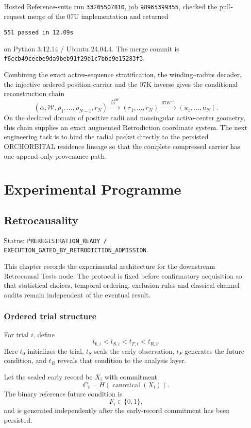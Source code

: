 \documentclass[11pt]{book}
\begin{document}
Hosted Reference-suite run \texttt{33205507810}, job \texttt{98965399355}, checked the pull-request merge of the 07U implementation and returned
\begin{verbatim}
551 passed in 12.09s
\end{verbatim}
on Python 3.12.14 / Ubuntu 24.04.4. The merge commit is \texttt{f6ccb49cecbe9da9beb91f29b1c7bbc9e15283f3}.

Combining the exact active-sequence stratification, the winding--radius decoder, the injective ordered position carrier and the 07K inverse gives the conditional reconstruction chain
\[
\boxed{
(\alpha,\mathcal W,\rho_1,\ldots,\rho_{N-1},r_N)
\xrightarrow{\ L_s^{\rho W}\ }
(r_1,\ldots,r_N)
\xrightarrow{\ 07K^{-1}\ }
(u_1,\ldots,u_N).
}
\]
On the declared domain of positive radii and nonsingular active-center geometry, this chain supplies an exact augmented Retrodiction coordinate system. The next engineering task is to bind the radial packet directly to the persisted ORCHORBITAL residence lineage so that the complete compressed carrier has one append-only provenance path.

\part{Experimental Programme}
\chapter{Retrocausality}

Status: \texttt{PREREGISTRATION\_READY / EXECUTION\_GATED\_BY\_RETRODICTION\_ADMISSION}.

This chapter records the experimental architecture for the downstream Retrocausal Tests node. The protocol is fixed before confirmatory acquisition so that statistical choices, temporal ordering, exclusion rules and classical-channel audits remain independent of the eventual result.

\section{Ordered trial structure}

For trial $i$, define
\[
\boxed{t_{0,i}<t_{S,i}<t_{F,i}<t_{R,i}.}
\]
Here $t_0$ initializes the trial, $t_S$ seals the early observation, $t_F$ generates the future condition, and $t_R$ reveals that condition to the analysis layer.

Let the sealed early record be $X_i$ with commitment
\[
\boxed{C_i=H(\operatorname{canonical}(X_i)).}
\]
The binary reference future condition is
\[
F_i\in\{0,1\},
\]
and is generated independently after the early-record commitment has been persisted.
\end{document}
